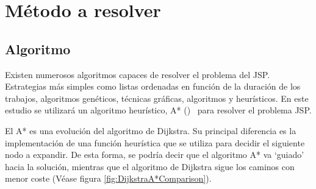 \section{Método a resolver}

\subsection{Algoritmo}

Existen numerosos algoritmos capaces de resolver el problema del JSP\@.
Estrategias más simples como listas ordenadas en función de la duración
de los trabajos, algoritmos genéticos, técnicas gráficas,
algoritmos  y heurísticos.
En este estudio se utilizará un algoritmo heurístico, A* ()~\cite{HNR68}
para resolver el problema JSP\@.

El A* es una evolución del algoritmo de Dijkstra.
Su principal diferencia es la implementación de una función heurística
que se utiliza para decidir el siguiente nodo a expandir.
De esta forma, se podría decir que el algoritmo A* va `guiado'
hacia la solución, mientras que el algoritmo de Dijkstra
sigue los caminos con menor coste (Véase figura \ref{fig:DijkstraA*Comparison}).

